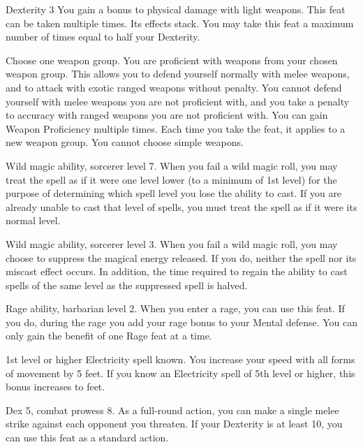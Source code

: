 \featpres Dexterity 3
\featben You gain a  bonus to physical damage with light weapons.
 This feat can be taken multiple times. Its effects stack.
You may take this feat a maximum number of times equal to half your Dexterity.

Choose one weapon group.
\featben You are proficient with weapons from your chosen weapon group.
This allows you to defend yourself normally with melee weapons, and to attack with exotic ranged weapons without penalty.
You cannot defend yourself with melee weapons you are not proficient with, and you take a  penalty to accuracy with ranged weapons you are not proficient with.
You can gain Weapon Proficiency multiple times.
Each time you take the feat, it applies to a new weapon group.
You cannot choose simple weapons.

\featpre Wild magic ability, sorcerer level 7.
\featben When you fail a wild magic roll, you may treat the spell as if it were one level lower (to a minimum of 1st level) for the purpose of determining which spell level you lose the ability to cast.
If you are already unable to cast that level of spells, you must treat the spell as if it were its normal level.

\featpre Wild magic ability, sorcerer level 3.
\featben When you fail a wild magic roll, you may choose to suppress the magical energy released.
If you do, neither the spell nor its miscast effect occurs.
In addition, the time required to regain the ability to cast spells of the same level as the suppressed spell is halved.

\featpre Rage ability, barbarian level 2.
\featben When you enter a rage, you can use this feat. If you do, during the rage you add your rage bonus to your Mental defense.
 You can only gain the benefit of one Rage feat at a time.

\featpre 1st level or higher Electricity spell known.
\featben You increase your speed with all forms of movement by 5 feet.
If you know an Electricity spell of 5th level or higher, this bonus increases to  feet.

\featpres Dex 5, combat prowess 8.
\featben As a full-round action, you can make a single melee strike against each opponent you threaten.
If your Dexterity is at least 10, you can use this feat as a standard action.

